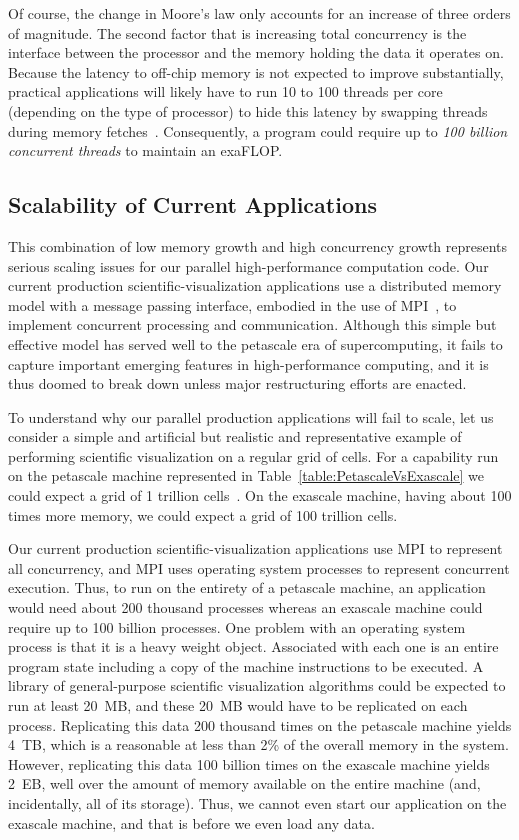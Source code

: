 \documentclass[conference]{IEEEtran}
\newcommand*{\lcite}[1]{~\cite{#1}}
\begin{document}
Of course, the change in Moore's law only accounts for an increase of three
orders of magnitude.  The second factor that is increasing total
concurrency is the interface between the processor and the memory holding
the data it operates on.  Because the latency to off-chip memory is not
expected to improve substantially, practical applications will likely have
to run 10 to 100 threads per core (depending on the type of processor) to
hide this latency by swapping threads during memory
fetches\lcite{ExascaleArchitecturesReport}.  Consequently, a program could
require up to \emph{100 billion concurrent threads} to maintain an
exaFLOP.

\subsection{Scalability of Current Applications}

\noindent
This combination of low memory growth and high concurrency growth
represents serious scaling issues for our parallel high-performance
computation code.  Our current production scientific-visualization
applications use a distributed memory model with a message passing
interface, embodied in the use of MPI\lcite{MPI}, to implement concurrent
processing and communication.  Although this simple but effective model has
served well to the petascale era of supercomputing, it fails to capture
important emerging features in high-performance computing, and it is thus
doomed to break down unless major restructuring efforts are enacted.

To understand why our parallel production applications will fail to scale,
let us consider a simple and artificial but realistic and representative
example of performing scientific visualization on a regular grid of cells.
For a capability run on the petascale machine represented in
Table~\ref{table:PetascaleVsExascale} we could expect a grid of 1 trillion
cells\lcite{Childs2010}.  On the exascale machine, having about 100 times
more memory, we could expect a grid of 100 trillion cells.

Our current production scientific-visualization applications use MPI to
represent all concurrency, and MPI uses operating system processes to
represent concurrent execution.  Thus, to run on the entirety of a
petascale machine, an application would need about 200 thousand processes
whereas an exascale machine could require up to 100 billion processes.  One
problem with an operating system process is that it is a heavy weight
object.  Associated with each one is an entire program state including a
copy of the machine instructions to be executed.  A library of
general-purpose scientific visualization algorithms could be expected to
run at least 20~MB, and these 20~MB would have to be replicated on each
process.  Replicating this data 200 thousand times on the petascale machine
yields 4~TB, which is a reasonable at less than 2\% of the overall memory
in the system.  However, replicating this data 100 billion times on the
exascale machine yields 2~EB, well over the amount of memory available on
the entire machine (and, incidentally, all of its storage).  Thus, we cannot
even start our application on the exascale machine, and that is before we
even load any data.
\end{document}
